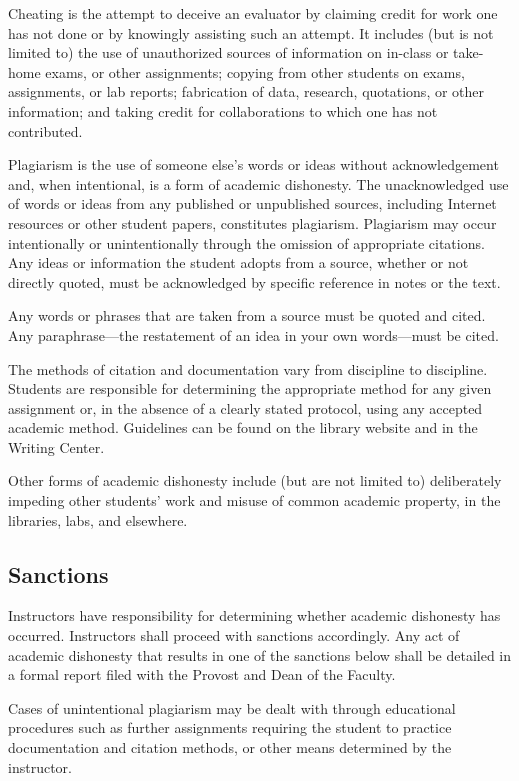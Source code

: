 \documentclass[
  letterpaper,
]{scrbook}
\begin{document}
Cheating is the attempt to deceive an evaluator by claiming credit for
work one has not done or by knowingly assisting such an attempt. It
includes (but is not limited to) the use of unauthorized sources of
information on in-class or take-home exams, or other assignments;
copying from other students on exams, assignments, or lab reports;
fabrication of data, research, quotations, or other information; and
taking credit for collaborations to which one has not contributed.

Plagiarism is the use of someone else's words or ideas without
acknowledgement and, when intentional, is a form of academic dishonesty.
The unacknowledged use of words or ideas from any published or
unpublished sources, including Internet resources or other student
papers, constitutes plagiarism. Plagiarism may occur intentionally or
unintentionally through the omission of appropriate citations. Any ideas
or information the student adopts from a source, whether or not directly
quoted, must be acknowledged by specific reference in notes or the text.

Any words or phrases that are taken from a source must be quoted and
cited. Any paraphrase---the restatement of an idea in your own
words---must be cited.

The methods of citation and documentation vary from discipline to
discipline. Students are responsible for determining the appropriate
method for any given assignment or, in the absence of a clearly stated
protocol, using any accepted academic method. Guidelines can be found on
the library website and in the Writing Center.

Other forms of academic dishonesty include (but are not limited to)
deliberately impeding other students' work and misuse of common academic
property, in the libraries, labs, and elsewhere.

\hypertarget{sanctions}{%
\subsection{Sanctions}\label{sanctions}}

Instructors have responsibility for determining whether academic
dishonesty has occurred. Instructors shall proceed with sanctions
accordingly. Any act of academic dishonesty that results in one of the
sanctions below shall be detailed in a formal report filed with the
Provost and Dean of the Faculty.

Cases of unintentional plagiarism may be dealt with through educational
procedures such as further assignments requiring the student to practice
documentation and citation methods, or other means determined by the
instructor.
\end{document}
